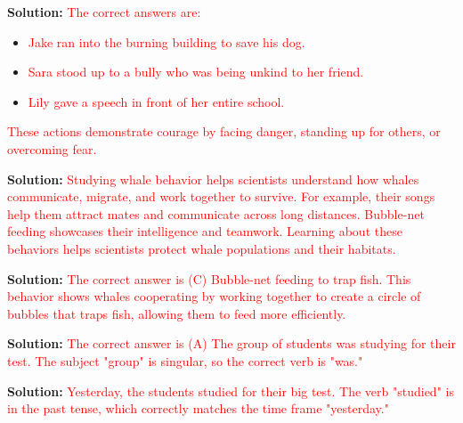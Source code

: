 \documentclass[12pt]{article}
\begin{document}
\begin{tcolorbox}[colframe=black!50, colback=white, title=Question 5]
\textbf{Solution:} \textcolor{red}{The correct answers are:}
\begin{itemize}
    \item \textcolor{red}{Jake ran into the burning building to save his dog.}
    \item \textcolor{red}{Sara stood up to a bully who was being unkind to her friend.}
    \item \textcolor{red}{Lily gave a speech in front of her entire school.}
\end{itemize}
\textcolor{red}{These actions demonstrate courage by facing danger, standing up for others, or overcoming fear.}
\end{tcolorbox}

\begin{tcolorbox}[colframe=black!50, colback=white, title=Question 6]
\textbf{Solution:} \textcolor{red}{Studying whale behavior helps scientists understand how whales communicate, migrate, and work together to survive. For example, their songs help them attract mates and communicate across long distances. Bubble-net feeding showcases their intelligence and teamwork. Learning about these behaviors helps scientists protect whale populations and their habitats.}
\end{tcolorbox}

\begin{tcolorbox}[colframe=black!50, colback=white, title=Question 7]
\textbf{Solution:} \textcolor{red}{The correct answer is (C) Bubble-net feeding to trap fish. This behavior shows whales cooperating by working together to create a circle of bubbles that traps fish, allowing them to feed more efficiently.}
\end{tcolorbox}

\begin{tcolorbox}[colframe=black!50, colback=white, title=Question 8]
\textbf{Solution:} \textcolor{red}{The correct answer is (A) The group of students was studying for their test. The subject "group" is singular, so the correct verb is "was."}
\end{tcolorbox}

\begin{tcolorbox}[colframe=black!50, colback=white, title=Question 9]
\textbf{Solution:} \textcolor{red}{Yesterday, the students studied for their big test. The verb "studied" is in the past tense, which correctly matches the time frame "yesterday."}
\end{tcolorbox}
\end{document}
